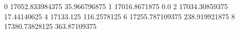 0 17052.833984375 35.966796875
1 17016.8671875 0.0
2 17034.30859375 17.44140625
4 17133.125 116.2578125
6 17255.787109375 238.919921875
8 17380.73828125 363.87109375
